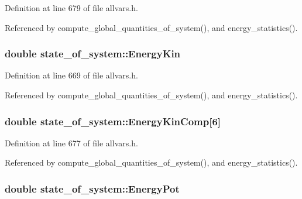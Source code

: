 Definition at line 679 of file allvars.h.



Referenced by compute\_\-global\_\-quantities\_\-of\_\-system(), and energy\_\-statistics().

\hypertarget{structstate__of__system_a92ed1ad5f1a02586030b21f5f3e560ec}{
\subsubsection[{EnergyKin}]{\setlength{\rightskip}{0pt plus 5cm}double {\bf state\_\-of\_\-system::EnergyKin}}}
\label{structstate__of__system_a92ed1ad5f1a02586030b21f5f3e560ec}


Definition at line 669 of file allvars.h.



Referenced by compute\_\-global\_\-quantities\_\-of\_\-system(), and energy\_\-statistics().

\hypertarget{structstate__of__system_a8b776a503b441fc690c0940e3386a2fb}{
\subsubsection[{EnergyKinComp}]{\setlength{\rightskip}{0pt plus 5cm}double {\bf state\_\-of\_\-system::EnergyKinComp}\mbox{[}6\mbox{]}}}
\label{structstate__of__system_a8b776a503b441fc690c0940e3386a2fb}


Definition at line 677 of file allvars.h.



Referenced by compute\_\-global\_\-quantities\_\-of\_\-system(), and energy\_\-statistics().

\hypertarget{structstate__of__system_aece07698cdbe00520fcb92ad9f04d435}{
\subsubsection[{EnergyPot}]{\setlength{\rightskip}{0pt plus 5cm}double {\bf state\_\-of\_\-system::EnergyPot}}}
\label{structstate__of__system_aece07698cdbe00520fcb92ad9f04d435}


